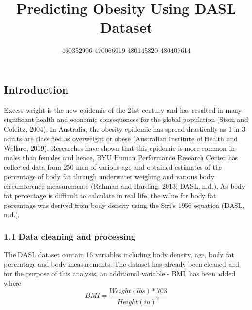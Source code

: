 \documentclass[a4paper,9pt,twocolumn,twoside,]{pinp}
\title{Predicting Obesity Using DASL Dataset}
\author[]{460352996 470066919 480145820 480407614}
\affil[]{GitHub code repository is
\href{https://github.sydney.edu.au/awon6941/DATA2002-M4.git}{here}}
\begin{document}
\verticaladjustment{-2pt}

\maketitle
\thispagestyle{firststyle}



\hypertarget{introduction}{%
\subsection{Introduction}\label{introduction}}

Excess weight is the new epidemic of the 21st century and has resulted
in many significant health and economic consequences for the global
population (Stein and Colditz, 2004). In Australia, the obesity epidemic
has spread drastically as 1 in 3 adults are classified as overweight or
obese (Australian Institute of Health and Welfare, 2019). Researches
have shown that this epidemic is more common in males than females and
hence, BYU Human Performance Research Center has collected data from 250
men of various age and obtained estimates of the percentage of body fat
through underwater weighing and various body circumference measurements
(Rahman and Harding, 2013; DASL, n.d.). As body fat percentage is
difficult to calculate in real life, the value for body fat percentage
was derived from body density using the Siri's 1956 equation (DASL,
n.d.).

\hypertarget{data-cleaning-and-processing}{%
\subsubsection{1.1 Data cleaning and
processing}\label{data-cleaning-and-processing}}

The DASL dataset contain 16 variables including body density, age, body
fat percentage and body measurements. The dataset has already been
cleaned and for the purpose of this analysis, an additional variable -
BMI, has been added where
\[ BMI = \frac{Weight (lbs)*703}{Height(in)^2} \]
\end{document}
